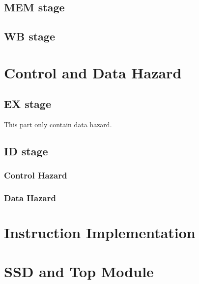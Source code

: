 \documentclass[12pt]{article}
\begin{document}
\subsection{MEM stage}
\subsection{WB stage}
\section{Control and Data Hazard}
\subsection{EX stage}
This part only contain data hazard.
\subsection{ID stage}
\subsubsection{Control Hazard}
\subsubsection{Data Hazard}
\section{Instruction Implementation}
\section{SSD and Top Module}
\end{document}
